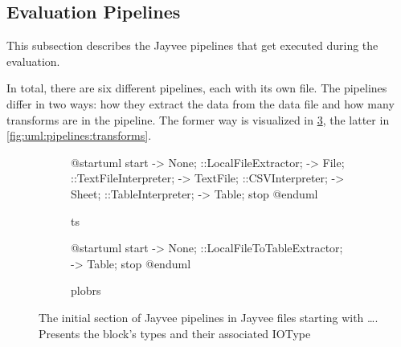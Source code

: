 \subsection{Evaluation Pipelines}

This subsection describes the Jayvee pipelines that get executed during the evaluation.

In total, there are six different pipelines, each with its own file.
The pipelines differ in two ways: how they extract the data from the data file and how many transforms are in the pipeline.
The former way is visualized in \ref{fig:uml:pipelines:backends},
the latter in \ref{fig:uml:pipelines:transforms}.
\begin{figure}
	\begin{subfigure}[h]{0.45\linewidth}
		\begin{plantuml}
			@startuml
			start
			-> None;
			::LocalFileExtractor;
			-> File;
			::TextFileInterpreter;
			-> TextFile;
			::CSVInterpreter;
			-> Sheet;
			::TableInterpreter;
			-> Table;
			stop
			@enduml
		\end{plantuml}
		\caption{ts}
		\label{fig:uml:pipelines:ts}
	\end{subfigure}
	\hfill
	\begin{subfigure}[h]{0.45\linewidth}
		\begin{plantuml}
			@startuml
			start
			-> None;
			::LocalFileToTableExtractor;
			-> Table;
			stop
			@enduml
		\end{plantuml}
		\caption{plobrs}
		\label{fig:uml:pipelines:plob}
	\end{subfigure}
	\caption{The initial section of Jayvee pipelines in Jayvee files starting with \dots . Presents the block's types and their associated IOType}
	\label{fig:uml:pipelines:backends}
\end{figure}

